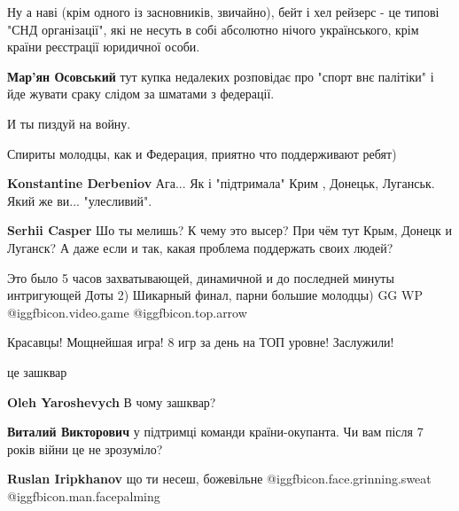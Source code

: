 \begin{itemize}
\begin{itemize}
\begin{itemize}
\end{itemize} %


Ну а наві (крім одного із засновників, звичайно), бейт і хел рейзерс - це
типові "СНД організації", які не несуть в собі абсолютно нічого українського,
крім країни реєстрації юридичної особи.

\textbf{Мар'ян Осовський} тут купка недалеких розповідає про "спорт внє палітіки" і йде жувати сраку слідом за шматами з федерації.

И ты пиздуй на войну.

\end{itemize} %

Спириты молодцы, как и Федерация, приятно что поддерживают ребят)

\begin{itemize} %
\textbf{Konstantine Derbeniov} Ага... Як і "підтримала" Крим , Донецьк, Луганськ. Який же ви... "улесливий".

\begin{itemize} %
\textbf{Serhii Casper} Шо ты мелишь? К чему это высер? При чём тут Крым, Донецк и Луганск? А даже если и так, какая проблема поддержать своих людей?
\end{itemize} %

\end{itemize} %


Это было 5 часов захватывающей, динамичной и до последней минуты интригующей Доты 2)
Шикарный финал, парни большие молодцы)
GG WP  @igg{fbicon.video.game}  @igg{fbicon.top.arrow} 

Красавцы! Мощнейшая игра! 8 игр за день на ТОП уровне! Заслужили!

це зашквар

\begin{itemize} %
\textbf{Oleh Yaroshevych} В чому зашквар?

\begin{itemize} %
\textbf{Виталий Викторович} у підтримці команди країни-окупанта. Чи вам після 7 років війни це не зрозуміло?

\textbf{Ruslan Iripkhanov} що ти несеш, божевільне @igg{fbicon.face.grinning.sweat}  @igg{fbicon.man.facepalming} 


\end{itemize}
\end{itemize}
\end{itemize}
